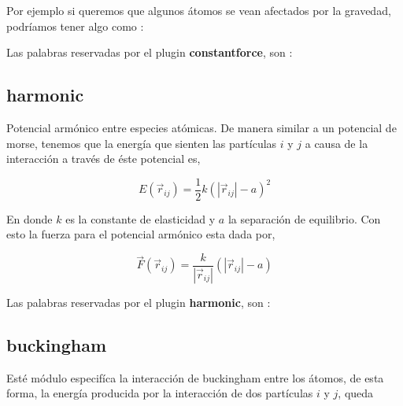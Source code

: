 Por ejemplo si queremos que algunos \'atomos se vean afectados por la gravedad, podr\'iamos tener algo como :


Las palabras reservadas por el plugin \textbf{constantforce}, son :


\subsection{harmonic}
Potencial arm\'onico entre especies at\'omicas. De manera similar a un potencial de morse, tenemos que la energ\'ia que sienten las part\'iculas $i$ y $j$ a causa de la interacci\'on a trav\'es de \'este potencial es,

$$E(\vec{r}_{ij}) = \frac{1}{2}k\left(|\vec{r}_{ij}|-a\right)^2$$

En donde $k$ es la constante de elasticidad y $a$ la separaci\'on de equilibrio. Con esto la fuerza para el potencial arm\'onico esta dada por,

$$\vec{F}(\vec{r}_{ij}) = \frac{k}{|\vec{r}_{ij}|}\left(|\vec{r}_{ij}|-a\right)$$

Las palabras reservadas por el plugin \textbf{harmonic}, son :


\subsection{buckingham}

Est\'e m\'odulo especif\'ica la interacci\'on de buckingham entre los \'atomos, de esta forma, la energ\'ia producida por la interacci\'on de dos part\'iculas $i$ y $j$, queda

